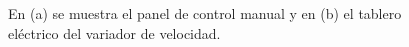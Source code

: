 \begin{figure}[H]
\begin{minipage}[b]{0.3\textwidth}
    \end{minipage}
    \hspace{1em} %
    \begin{minipage}[b]{0.3\textwidth}
    \end{minipage}  
    \caption{En (a) se muestra el panel de control manual y en (b) el tablero eléctrico del variador de velocidad.}
    \label{fig:controlTunel}
\end{figure}    
